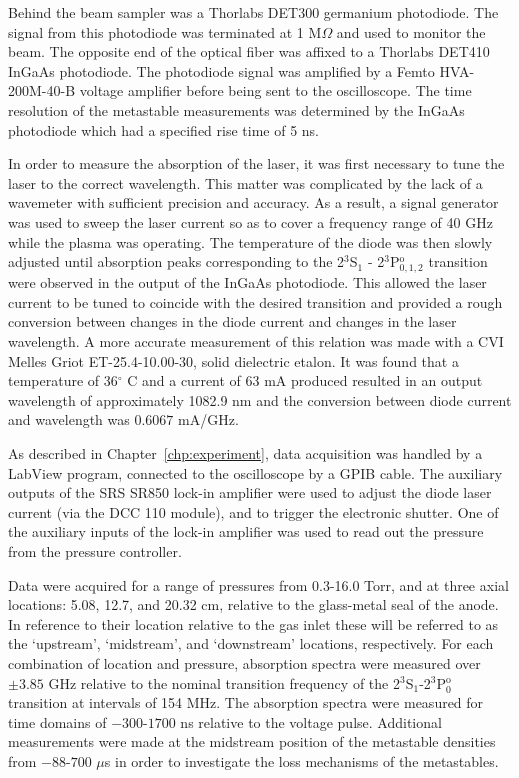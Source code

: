 Behind the beam sampler was a Thorlabs DET300 germanium photodiode. The signal
from this photodiode was terminated at 1 M$\Omega$ and used to monitor the beam.
The opposite end of the optical fiber was affixed to a Thorlabs DET410 InGaAs
photodiode. The photodiode signal was amplified by a Femto HVA-200M-40-B voltage
amplifier before being sent to the oscilloscope. The time resolution of the
metastable measurements was determined by the InGaAs photodiode which had a
specified rise time of 5 ns.

In order to measure the absorption of the laser, it was first necessary to tune
the laser to the correct wavelength. This matter was complicated by the lack of
a wavemeter with sufficient precision and accuracy. As a result, a signal
generator was used to sweep the laser current so as to cover a frequency range
of 40 GHz while the plasma was operating. The temperature of the diode was then
slowly adjusted until absorption peaks corresponding to the 2$^3$S$_1$ -
2$^3$P$_{0,1,2}^\mathrm{o}$ transition were observed in the output of the InGaAs
photodiode. This allowed the laser current to be tuned to coincide with the
desired transition and provided a rough conversion between changes in the diode
current and changes in the laser wavelength. A more accurate measurement of this
relation was made with a CVI Melles Griot ET-25.4-10.00-30, solid dielectric
etalon. It was found that a temperature of 36$^\circ$ C and a current of 63 mA
produced resulted in an output wavelength of approximately 1082.9 nm and the
conversion between diode current and wavelength was $0.6067$ mA/GHz.

As described in Chapter~\ref{chp:experiment}, data acquisition was handled by a
LabView program, connected to the oscilloscope by a GPIB cable. The auxiliary
outputs of the SRS SR850 lock-in amplifier were used to adjust the diode laser
current (via the DCC 110 module), and to trigger the electronic shutter. One of
the auxiliary inputs of the lock-in amplifier was used to read out the pressure
from the pressure controller.

Data were acquired for a range of pressures from 0.3-16.0 Torr, and at three
axial locations: 5.08, 12.7, and 20.32 cm, relative to the glass-metal seal of
the anode. In reference to their location relative to the gas inlet these will
be referred to as the `upstream', `midstream', and `downstream' locations,
respectively. For each combination of location and pressure, absorption spectra
were measured over $\pm3.85$ GHz relative to the nominal transition frequency of
the 2$^3$S$_1$-2$^3$P$_0^\mathrm{o}$ transition at intervals of 154 MHz. The
absorption spectra were measured for time domains of $-300$-$1700$ ns relative
to the voltage pulse. Additional measurements were made at the midstream
position of the metastable densities from $-88$-$700$ $\mu$s in order to
investigate the loss mechanisms of the metastables.


